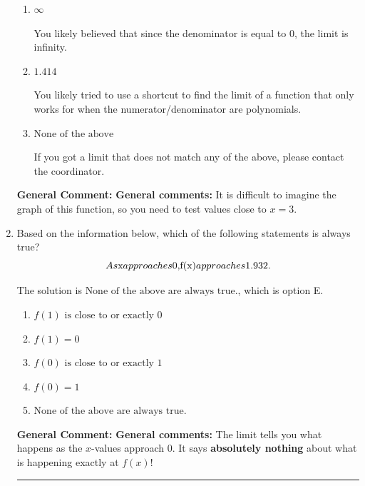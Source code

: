 \documentclass{extbook}[14pt]
\newcommand{\litem}[1]{\item #1

\rule{\textwidth}{0.4pt}}
\begin{document}
\begin{enumerate}
{\begin{enumerate}[label=\Alph*.]
* This is the correct option.
\item \( \infty \)

You likely believed that since the denominator is equal to 0, the limit is infinity.
\item \( 1.414 \)

You likely tried to use a shortcut to find the limit of a function that only works for when the numerator/denominator are polynomials.
\item \( \text{None of the above} \)

If you got a limit that does not match any of the above, please contact the coordinator.
\end{enumerate}

\textbf{General Comment:} \textbf{General comments:} It is difficult to imagine the graph of this function, so you need to test values close to $x = 3$.
}
\litem{
Based on the information below, which of the following statements is always true?
\[ As $x$ approaches $0$, $f(x)$ approaches $1.932$. \]

The solution is \( \text{None of the above are always true.} \), which is option E.\begin{enumerate}[label=\Alph*.]
\item \( f(1) \text{ is close to or exactly } 0 \)


\item \( f(1) = 0 \)


\item \( f(0) \text{ is close to or exactly } 1 \)


\item \( f(0) = 1 \)


\item \( \text{None of the above are always true.} \)


\end{enumerate}

\textbf{General Comment:} \textbf{General comments:} The limit tells you what happens as the $x$-values approach $0$. It says \textbf{absolutely nothing} about what is happening exactly at $f(x)$!
}
\end{enumerate}
\end{document}

